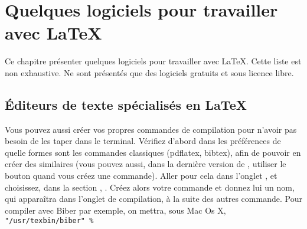 \chapter{Quelques logiciels pour travailler avec \LaTeX}\label{logiciels}

\begin{intro}
Ce chapitre  présenter quelques logiciels pour travailler avec \LaTeX. Cette liste est non exhaustive. Ne sont présentés que des logiciels gratuits et sous licence libre.
\end{intro}

\section{Éditeurs de texte spécialisés en \LaTeX}\label{editeurs}



\begin{plusloins}
Vous pouvez aussi créer vos propres commandes de compilation pour n'avoir pas besoin de les taper dans le terminal. Vérifiez d'abord  dans les préférences de quelle formes sont les commandes classiques (pdflatex, bibtex), afin de pouvoir en créer des similaires (vous pouvez aussi, dans la dernière version de , utiliser le bouton  quand vous créez une commande). Aller pour cela dans l'onglet , et choisissez, dans la section ,  . Créez alors votre commande et donnez lui un nom, qui apparaîtra dans l'onglet de compilation, à la suite des autres  commande. Pour compiler avec Biber par exemple, on mettra, sous Mac Os X,  \verb|"/usr/texbin/biber" % |
	
\end{plusloins}	

